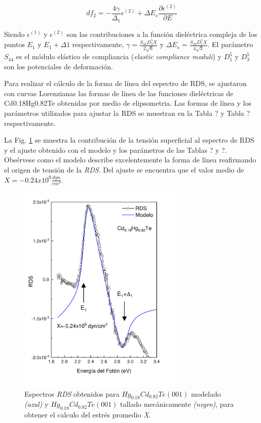 \begin{equation}
    df_{2} = {-\frac{4\gamma}{\Delta_{1}} \epsilon^{(2)}} +  \Delta E_{s}\frac{\partial \epsilon^{(2)}}{\partial E} 
\end{equation}

Siendo $\epsilon^{(1)}$ y $\epsilon^{(2)}$ son las contribuciones a la función dieléctrica compleja de los puntos 
$E_{1}$ y $E_{1}+\Delta1$ respectivamente, $\gamma = \frac{S_{44} D_{3}^{5} X}{2\sqrt{6}}$ y 
$\Delta E_{s} = \frac{S_{44} D_{1}^{5} X}{4\sqrt{3}}$. 
El parámetro  $S_{44}$ es el módulo elástico de compliancia (\textit{elastic compliance moduli}) y $D_{1}^{5}$ y 
$D_{3}^{5}$ son los potenciales de deformación.

Para realizar el cálculo de la forma de línea del espectro de RDS, se ajustaron con curvas Lorenzianas las formas de línea de 
las funciones dieléctricas de Cd0.18Hg0.82Te obtenidas por medio de elipsometria\cite{Camacho2005}. Las formas de línea 
y los parámetros utilizados para ajustar la RDS se muestran en la Tabla ? y Tabla ? 
respectivamente\cite{LastrasMartnez2009}\cite{LastrasMartnez2010}. 

La Fig. \ref{fig:hgcdte_rds_stress} se muestra la contribución de la tensión superficial al espectro de RDS y el 
ajuste obtenido con el modelo y los parámetros de las Tablas ? y ?. Obsérvese como el modelo describe excelentemente 
la forma de línea reafirmando el origen de tensión de la \textit{RDS}. Del ajuste se encuentra que el valor medio 
de $ X = -0.24x10^{9} \frac{dyn}{cm^{2}}$.

\begin{figure}[h!]
    \centering
    \includegraphics[width=0.7\textwidth]{figures/chap4/hgcdte_rds_stress.pdf}
        \caption{Espectros \textit{RDS} obtenidos para $ Hg_{0.18}Cd_{0.82}Te (001)$ modelado \textit{(azul)} y 
        $ Hg_{0.18}Cd_{0.82}Te (001)$ tallado mecánicamente \textit{(negro)}, para obtener el calculo del estrés
        promedio \textit{X}.}
    \label{fig:hgcdte_rds_stress}
\end{figure}


